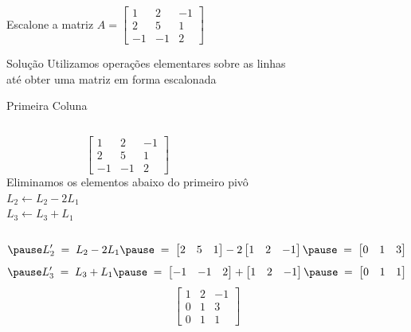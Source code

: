 \begin{question}
Escalone a matriz
\(
  A=
  \begin{bmatrix}
    1  & 2  & -1 \\
    2  & 5  & 1  \\
    -1 & -1 & 2
  \end{bmatrix}
\)
\end{question}

\begin{resolution}{Solução}
  Utilizamos operações elementares sobre as linhas\\
  até obter uma matriz em forma escalonada
\end{resolution}

\begin{resolution}{Primeira Coluna}
\begin{columns}
  \[
  \begin{bmatrix}
    1  & 2  & -1 \\
    2  & 5  & 1  \\
    -1 & -1 & 2
  \end{bmatrix}
  \]
  \pause
{}
  Eliminamos os elementos abaixo do primeiro pivô
  \\ \pause
  \(L_2 \leftarrow L_2-2 L_1\)
  \\ \pause
  \(L_3\leftarrow L_3+L_1\)
\end{columns}
\vspace{-\baselineskip}
\[
  \pause
  L'_2
  \;=\;
  L_2 - 2 L_1
  \pause
  \;=\;
  \begin{bmatrix}
    2  & 5  & 1
  \end{bmatrix}
  - 2
  \begin{bmatrix}
    1  & 2  & -1
  \end{bmatrix}
  \pause
  \;=\;
  \begin{bmatrix}
    0 & 1 & 3
  \end{bmatrix}
\]
\[
  \pause
  L'_3
  \;=\;
  L_3 + L_1
  \pause
  \;=\;
  \begin{bmatrix}
    -1 & -1 & 2
  \end{bmatrix}
  +
  \begin{bmatrix}
    1  & 2  & -1
  \end{bmatrix}
  \pause
  \;=\;
  \begin{bmatrix}
    0 & 1 & 1
  \end{bmatrix}
\]
\pause
\[
  \begin{bmatrix}
    1 & 2 & -1 \\
    0 & 1 & 3  \\
    0 & 1 & 1
  \end{bmatrix}
\]
\end{resolution}

